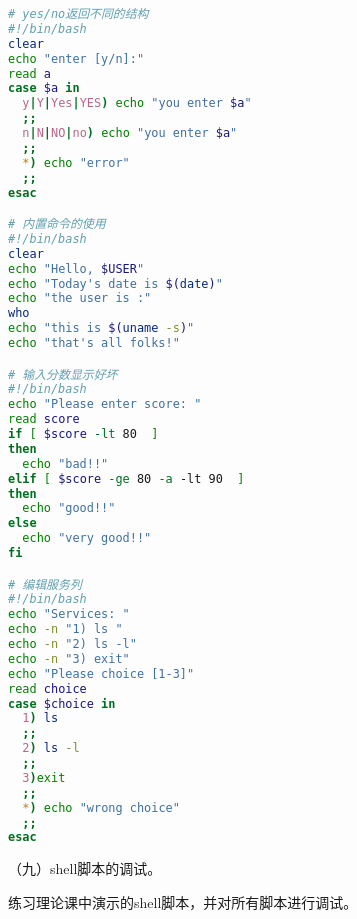 \begin{lstlisting}[language=bash]
# yes/no返回不同的结构
#!/bin/bash
clear
echo "enter [y/n]:"
read a
case $a in
  y|Y|Yes|YES) echo "you enter $a"
  ;;
  n|N|NO|no) echo "you enter $a"
  ;;
  *) echo "error"
  ;;
esac

# 内置命令的使用
#!/bin/bash
clear
echo "Hello, $USER"
echo "Today's date is $(date)"
echo "the user is :"
who
echo "this is $(uname -s)"
echo "that's all folks!"

# 输入分数显示好坏
#!/bin/bash
echo "Please enter score: "
read score
if [ $score -lt 80  ]
then
  echo "bad!!"
elif [ $score -ge 80 -a -lt 90  ]
then
  echo "good!!"
else
  echo "very good!!"
fi

# 编辑服务列
#!/bin/bash
echo "Services: "
echo -n "1) ls "
echo -n "2) ls -l"
echo -n "3) exit"
echo "Please choice [1-3]"
read choice
case $choice in
  1) ls
  ;;
  2) ls -l
  ;;
  3)exit
  ;;
  *) echo "wrong choice"
  ;;
esac
\end{lstlisting}

\vspace{0.1in}
（九）shell脚本的调试。

练习理论课中演示的shell脚本，并对所有脚本进行调试。

